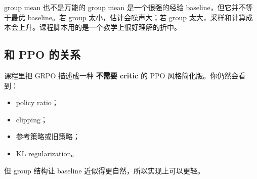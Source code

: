 \begin{warningbox}{group mean 也不是万能的}
group mean 是一个很强的经验 baseline，但它并不等于最优 baseline。若 group 太小，估计会噪声大；若 group 太大，采样和计算成本会上升。课程脚本用的是一个教学上很好理解的折中。
\end{warningbox}

\subsection{和 PPO 的关系}

课程里把 GRPO 描述成一种 \textbf{不需要 critic} 的 PPO 风格简化版。你仍然会看到：
\begin{itemize}
    \item policy ratio；
    \item clipping；
    \item 参考策略或旧策略；
    \item KL regularization。
\end{itemize}

但 group 结构让 baseline 近似得更自然，所以实现上可以更轻。


